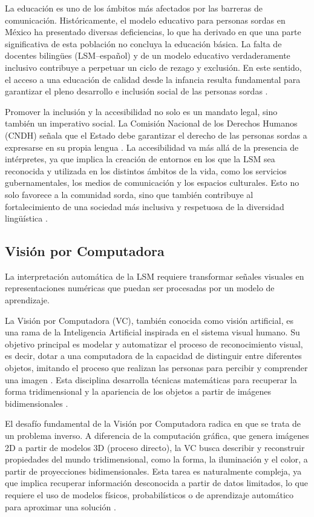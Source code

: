 	La educación es uno de los ámbitos más afectados por las barreras de comunicación. Históricamente, el modelo educativo para personas sordas en México ha presentado diversas deficiencias, lo que ha derivado en que una parte significativa de esta población no concluya la educación básica. La falta de docentes bilingües (LSM–español) y de un modelo educativo verdaderamente inclusivo contribuye a perpetuar un ciclo de rezago y exclusión. En este sentido, el acceso a una educación de calidad desde la infancia resulta fundamental para garantizar el pleno desarrollo e inclusión social de las personas sordas \cite{copred_sordos}.
	
	Promover la inclusión y la accesibilidad no solo es un mandato legal, sino también un imperativo social. La Comisión Nacional de los Derechos Humanos (CNDH) señala que el Estado debe garantizar el derecho de las personas sordas a expresarse en su propia lengua \cite{cndh_lsm}. La accesibilidad va más allá de la presencia de intérpretes, ya que implica la creación de entornos en los que la LSM sea reconocida y utilizada en los distintos ámbitos de la vida, como los servicios gubernamentales, los medios de comunicación y los espacios culturales. Esto no solo favorece a la comunidad sorda, sino que también contribuye al fortalecimiento de una sociedad más inclusiva y respetuosa de la diversidad lingüística \cite{copred_sordos}.
	
	\subsection{Visión por Computadora}
	
	La interpretación automática de la LSM requiere transformar señales visuales en representaciones numéricas que puedan ser procesadas por un modelo de aprendizaje.
	
	La Visión por Computadora (VC), también conocida como visión artificial, es una rama de la Inteligencia Artificial inspirada en el sistema visual humano. Su objetivo principal es modelar y automatizar el proceso de reconocimiento visual, es decir, dotar a una computadora de la capacidad de distinguir entre diferentes objetos, imitando el proceso que realizan las personas para percibir y comprender una imagen \cite{cantero_vision}. Esta disciplina desarrolla técnicas matemáticas para recuperar la forma tridimensional y la apariencia de los objetos a partir de imágenes bidimensionales \cite{szeliski2022}.
	
	El desafío fundamental de la Visión por Computadora radica en que se trata de un problema inverso. A diferencia de la computación gráfica, que genera imágenes 2D a partir de modelos 3D (proceso directo), la VC busca describir y reconstruir propiedades del mundo tridimensional, como la forma, la iluminación y el color, a partir de proyecciones bidimensionales. Esta tarea es naturalmente compleja, ya que implica recuperar información desconocida a partir de datos limitados, lo que requiere el uso de modelos físicos, probabilísticos o de aprendizaje automático para aproximar una solución \cite{szeliski2022}.
	
